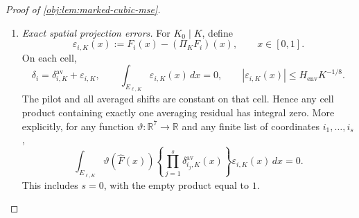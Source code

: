 \begin{proof}[Proof of \cref{obj:lem:marked-cubic-mse}]
\begin{enumerate}
Define the integrated remainder and its majorant by
\[
\mathsf R_{\mathrm{rem},A}
:=\int_0^1\mathcal R_{A,4}(x)\,dx,
\qquad
\mathsf G_{\mathrm{rem}}
:=\frac{M_\Phi}{24}
\int_0^1\left(\sum_i|\delta_i(x)|\right)^4dx.
\]
Then
\[
|\mathsf R_{\mathrm{rem},A}|\le\mathsf G_{\mathrm{rem}},
\qquad
0\le\mathsf G_{\mathrm{rem}}
\le\frac{M_\Phi}{24}(14C_f)^4.
\]
Cauchy--Schwarz on \([0,1]\), followed by the finite-sum eighth-power inequality, gives
\[
\begin{aligned}
\mathbb E_P[\mathsf G_{\mathrm{rem}}^2]
&\le
(M_\Phi/24)^2
\mathbb E_P\int_0^1
\left(\sum_i|\delta_i(x)|\right)^8dx\\
&\le
(M_\Phi/24)^2\,7^7
\sum_{i\in\mathcal I}\mathbb E_P\int_0^1|\delta_i(x)|^8dx\\
&\le
(M_\Phi/24)^2\,7^8C_{\mathrm{pilot},8}n^{-4/5}.
\end{aligned}
\]
Define
\[
\mathcal B_{\mathrm{rem}}
:=(M_\Phi/24)^2\,7^8C_{\mathrm{pilot},8}.
\]
Since \(n^{-4/5}\le n^{-2/3}\),
\[
\mathbb E_P[\mathsf G_{\mathrm{rem}}^2]
\le\mathcal B_{\mathrm{rem}}n^{-2/3}.
\]
Integrating the defining Taylor identity also yields
\[
T_A=
\int_0^1\Phi_A(\widehat F(x))\,dx
+\sum_{s=1}^3\mathsf T^{\mathrm{Taylor}}_{A,s}
+\mathsf R_{\mathrm{rem},A}.
\]

\item \textit{Exact spatial projection errors.}
For \(K_0\mid K\), define
\[
\varepsilon_{i,K}(x):=F_i(x)-(\Pi_KF_i)(x),
\qquad x\in[0,1].
\]
On each cell,
\[
\delta_i=\delta^{\mathrm{av}}_{i,K}+\varepsilon_{i,K},
\qquad
\int_{E_{\ell,K}}\varepsilon_{i,K}(x)\,dx=0,
\qquad
|\varepsilon_{i,K}(x)|\le H_{\mathrm{env}}K^{-1/8}.
\]
The pilot and all averaged shifts are constant on that cell. Hence any cell product containing exactly one averaging residual has integral zero. More explicitly, for any function \(\vartheta:\mathbb R^7\to\mathbb R\) and any finite list of coordinates \(i_1,\ldots,i_s\),
\[
\int_{E_{\ell,K}}
\vartheta(\widehat F(x))
\left\{\prod_{j=1}^s\delta^{\mathrm{av}}_{i_j,K}(x)\right\}
\varepsilon_{i,K}(x)\,dx=0.
\]
This includes \(s=0\), with the empty product equal to \(1\).


\end{enumerate}
\end{proof}
